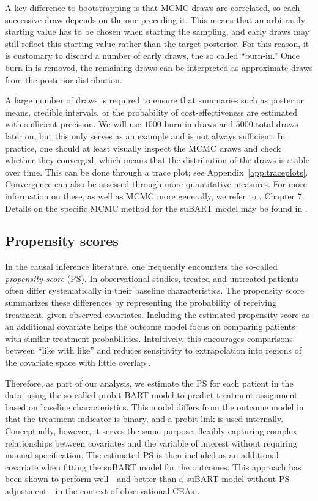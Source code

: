 \documentclass[aoas,preprint]{imsart}
\theoremstyle{plain}
\theoremstyle{definition}
\theoremstyle{remark}
\theoremstyle{remark}
\begin{document}
A key difference to bootstrapping is that MCMC draws are correlated, so each successive draw depends on the one preceding it. This means that an arbitrarily starting value has to be chosen when starting the sampling, and early draws may still reflect this starting value rather than the target posterior. For this reason, it is customary to discard a number of early draws, the so called ``burn-in.'' 
Once burn-in is removed, the remaining draws can be interpreted as approximate draws from the posterior distribution. 

A large number of draws is required to ensure that summaries such as posterior means, credible intervals, or the probability of cost-effectiveness are estimated with sufficient precision. We will use $1000$ burn-in draws and $5000$ total draws later on, but this only serves as an example and is not always sufficient. 
In practice, one should at least visually inspect the MCMC draws and check whether they converged, which means that the distribution of the draws is stable over time. This can be done through a trace plot; see Appendix~\ref{app:traceplots}. Convergence can also be assessed through more quantitative measures. 
For more information on these, as well as MCMC more generally, we refer to \citet{greenberg2012introduction}, Chapter 7.
Details on the specific MCMC method for the suBART model may be found in \citet{esser2025seemingly}.

\subsection{Propensity scores}
In the causal inference literature, one frequently encounters the so-called \emph{propensity score} (PS). In observational studies, treated and untreated patients often differ systematically in their baseline characteristics. The propensity score summarizes these differences by representing the probability of receiving treatment, given observed covariates. Including the estimated propensity score as an additional covariate helps the outcome model focus on comparing patients with similar treatment probabilities. Intuitively, this encourages comparisons between ``like with like'' and reduces sensitivity to extrapolation into regions of the covariate space with little overlap \citep{hahn2020bayesian}. 

Therefore, as part of our analysis, we estimate the PS for each patient in the data, using the so-called probit BART model \citep{chipman2010bart} to predict treatment assignment based on baseline characteristics. This model differs from the outcome model in that the treatment indicator is binary, and a probit link is used internally. Conceptually, however, it serves the same purpose: flexibly capturing complex relationships between covariates and the variable of interest without requiring manual specification. The estimated PS is then included as an additional covariate when fitting the suBART model for the outcomes. This approach has been shown to perform well—and better than a suBART model without PS adjustment—in the context of observational CEAs \citep{esser2025seemingly}.
\end{document}
